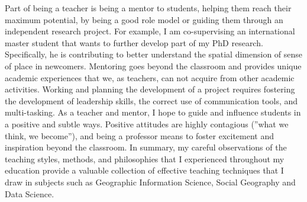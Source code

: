 Part of being a teacher is being a mentor to students, helping them reach their maximum potential, by being a good role model or guiding them through an independent research project. For example, I am co-supervising an international master student that wants to further develop part of my PhD research. Specifically, he is contributing to better understand the spatial dimension of sense of place in newcomers. Mentoring goes beyond the classroom and provides unique academic experiences that we, as teachers, can not acquire from other academic activities. Working and planning the development of a project requires fostering the development of leadership skills, the correct use of communication tools, and multi-tasking. As a teacher and mentor, I hope to guide and influence students in a positive and subtle ways. Positive attitudes are highly contagious (”what we think, we become”), and being a professor means to foster excitement and inspiration beyond the classroom. In summary, my careful observations of the teaching styles, methods, and philosophies that I experienced throughout my education provide a valuable collection of effective teaching techniques that I draw in subjects such as Geographic Information Science, Social Geography and Data Science. \par
